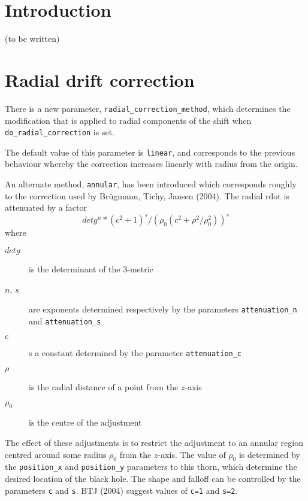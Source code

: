 \section{Introduction}

(to be written)



\section{Radial drift correction}

There is a new parameter, \texttt{radial\_correction\_method}, which
determines the modification that is applied to radial components of
the shift when \texttt{do\_radial\_correction} is set.

The default value of this parameter is \texttt{linear}, and
corresponds to the previous behaviour whereby the correction increases
linearly with radius from the origin.

An alternate method, \texttt{annular}, has been introduced which
corresponds roughly to the correction used by Br\"ugmann, Tichy,
Jansen (2004).  The radial rdot is attenuated by a factor
\begin{equation}
  detg^n * (c^2 + 1)^s / (\rho_0 (c^2 + \rho^2/\rho_0^2))^s
\end{equation}
where
\begin{description}
\item[$detg$]
        is the determinant of the 3-metric
\item[$n$, $s$]
        are exponents determined respectively by the parameters
        \texttt{attenuation\_n} and \texttt{attenuation\_s}
\item[$c$]
        s a constant determined by the parameter \texttt{attenuation\_c}
\item[$\rho$]
        is the radial distance of a point from the $z$-axis
\item[$\rho_0$]
        is the centre of the adjustment
\end{description}

The effect of these adjustments is to restrict the adjustment to an
annular region centred around some radius $\rho_0$ from the $z$-axis.
The value of $\rho_0$ is determined by the \texttt{position\_x} and
\texttt{position\_y} parameters to this thorn, which determine the
desired location of the black hole.  The shape and falloff can be
controlled by the parameters \texttt{c} and \texttt{s}.  BTJ (2004)
suggest values of \texttt{c=1} and \texttt{s=2}.

